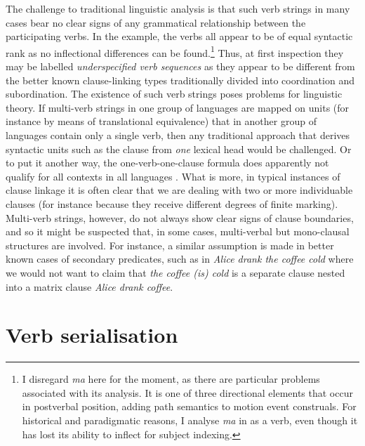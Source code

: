 The challenge to traditional linguistic analysis is that such verb strings in many cases bear no clear signs of any grammatical relationship between the participating verbs. In the example, the verbs all appear to be of equal syntactic rank as no inflectional differences can be found.\footnote{I disregard \textit{ma} here for the moment, as there are particular problems associated with its analysis. It is one of three directional elements that occur in postverbal position, adding path semantics to motion event construals. For historical and paradigmatic reasons, I analyse \textit{ma} in  as a verb, even though it has lost its ability to inflect for subject indexing.} Thus, at first inspection they may be labelled \textit{underspecified verb sequences} as they appear to be different from the better known clause-linking types traditionally divided into coordination and subordination. The existence of such verb strings poses problems for linguistic theory. If multi-verb strings in one group of languages are mapped on units (for instance by means of translational equivalence) that in another group of languages contain only a single verb, then any traditional approach that derives syntactic units such as the clause from \emph{one} lexical head would be challenged. Or to put it another way, the one-verb-one-clause formula does apparently not qualify for all contexts in all languages \citep{foley1985clausehood}. What is more, in typical instances of clause linkage it is often clear that we are dealing with two or more individuable clauses (for instance because they receive different degrees of finite marking). Multi-verb strings, however, do not always show clear signs of clause boundaries, and so it might be suspected that, in some cases,  multi-verbal but mono-clausal structures are involved. For instance, a similar assumption is made in better known cases of secondary predicates, such as in \textit{Alice drank the coffee cold} where we would not want to claim that \textit{the coffee (is) cold} is a separate clause nested into a matrix clause \textit{Alice drank coffee}.

\section{Verb serialisation}

